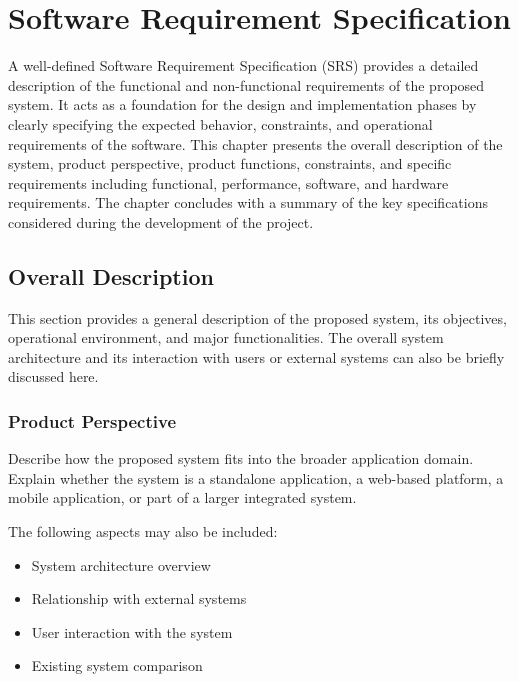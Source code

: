 \chapter{Software Requirement Specification}

A well-defined Software Requirement Specification (SRS) provides a detailed description of the functional and non-functional requirements of the proposed system. It acts as a foundation for the design and implementation phases by clearly specifying the expected behavior, constraints, and operational requirements of the software. This chapter presents the overall description of the system, product perspective, product functions, constraints, and specific requirements including functional, performance, software, and hardware requirements. The chapter concludes with a summary of the key specifications considered during the development of the project.


\section{Overall Description}

This section provides a general description of the proposed system, its objectives, operational environment, and major functionalities. The overall system architecture and its interaction with users or external systems can also be briefly discussed here.


\subsection{Product Perspective}

Describe how the proposed system fits into the broader application domain. Explain whether the system is a standalone application, a web-based platform, a mobile application, or part of a larger integrated system.

The following aspects may also be included:
\begin{itemize}
    \item System architecture overview
    \item Relationship with external systems
    \item User interaction with the system
    \item Existing system comparison
\end{itemize}

